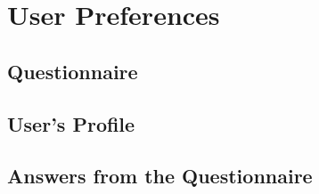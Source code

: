 \chapter{User Preferences}

\section{Questionnaire}

\section{User's Profile}

\section{Answers from the Questionnaire}